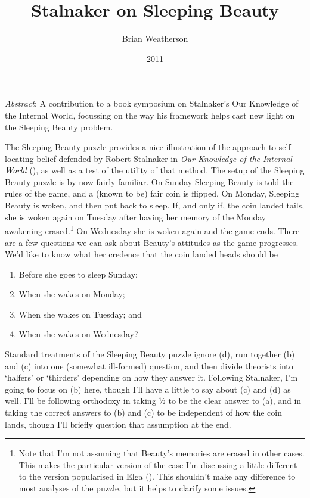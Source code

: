 \documentclass[
  11pt,
  letterpaper,
  DIV=11,
  numbers=noendperiod,
  twoside]{scrartcl}
\title{Stalnaker on Sleeping Beauty}
\author{Brian Weatherson}
\date{2011}
\providecommand{\tightlist}{%
  \setlength{\itemsep}{0pt}\setlength{\parskip}{0pt}}\usepackage{longtable,booktabs,array}
\renewenvironment{abstract}
 {\vspace{-1.25cm}
 \quotation\small\noindent\emph{Abstract}:}
 {\endquotation}
\begin{document}
\maketitle
\begin{abstract}
A contribution to a book symposium on Stalnaker's Our Knowledge of the
Internal World, focussing on the way his framework helps cast new light
on the Sleeping Beauty problem.
\end{abstract}


The Sleeping Beauty puzzle provides a nice illustration of the approach
to self-locating belief defended by Robert Stalnaker in \emph{Our
Knowledge of the Internal World} (), as well as a test of the utility of that method. The setup of
the Sleeping Beauty puzzle is by now fairly familiar. On Sunday Sleeping
Beauty is told the rules of the game, and a (known to be) fair coin is
flipped. On Monday, Sleeping Beauty is woken, and then put back to
sleep. If, and only if, the coin landed tails, she is woken again on
Tuesday after having her memory of the Monday awakening
erased.\footnote{Note that I'm not assuming that Beauty's memories are
  erased in other cases. This makes the particular version of the case
  I'm discussing a little different to the version popularised in Elga
  (). This shouldn't make any difference to
  most analyses of the puzzle, but it helps to clarify some issues.} On
Wednesday she is woken again and the game ends. There are a few
questions we can ask about Beauty's attitudes as the game progresses.
We'd like to know what her credence that the coin landed heads should be

\begin{enumerate}
\def\labelenumi{\arabic{enumi}.}
\tightlist
\item
  Before she goes to sleep Sunday;
\item
  When she wakes on Monday;
\item
  When she wakes on Tuesday; and
\item
  When she wakes on Wednesday?
\end{enumerate}

Standard treatments of the Sleeping Beauty puzzle ignore (d), run
together (b) and (c) into one (somewhat ill-formed) question, and then
divide theorists into `halfers' or `thirders' depending on how they
answer it. Following Stalnaker, I'm going to focus on (b) here, though
I'll have a little to say about (c) and (d) as well. I'll be following
orthodoxy in taking ½ to be the clear answer to (a), and in taking the
correct answers to (b) and (c) to be independent of how the coin lands,
though I'll briefly question that assumption at the end.
\end{document}
